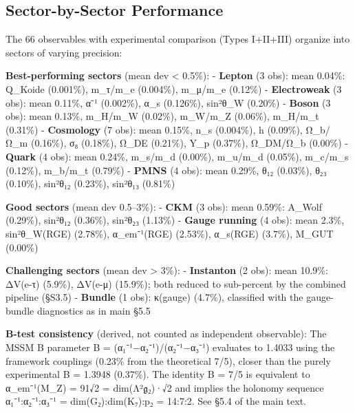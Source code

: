 \documentclass[11pt,a4paper]{article}
\begin{document}
\subsection{Sector-by-Sector Performance}\label{sector-by-sector-performance}

The 66 observables with experimental comparison (Types I+II+III) organize into sectors of varying precision:

\textbf{Best-performing sectors} (mean dev \textless{} 0.5\%): - \textbf{Lepton} (3 obs): mean 0.04\%: Q\_\allowbreak{}Koide (0.001\%), m\_\allowbreak{}τ/m\_\allowbreak{}e (0.004\%), m\_\allowbreak{}μ/m\_\allowbreak{}e (0.12\%) - \textbf{Electroweak} (3 obs): mean 0.11\%, α⁻¹ (0.002\%), α\_\allowbreak{}s (0.126\%), sin²θ\_\allowbreak{}W (0.20\%) - \textbf{Boson} (3 obs): mean 0.13\%, m\_\allowbreak{}H/m\_\allowbreak{}W (0.02\%), m\_\allowbreak{}W/m\_\allowbreak{}Z (0.06\%), m\_\allowbreak{}H/m\_\allowbreak{}t (0.31\%) - \textbf{Cosmology} (7 obs): mean 0.15\%, n\_\allowbreak{}s (0.004\%), h (0.09\%), Ω\_\allowbreak{}b/Ω\_\allowbreak{}m (0.16\%), σ₈ (0.18\%), Ω\_\allowbreak{}DE (0.21\%), Y\_\allowbreak{}p (0.37\%), Ω\_\allowbreak{}DM/Ω\_\allowbreak{}b (0.00\%) - \textbf{Quark} (4 obs): mean 0.24\%, m\_\allowbreak{}s/m\_\allowbreak{}d (0.00\%), m\_\allowbreak{}u/m\_\allowbreak{}d (0.05\%), m\_\allowbreak{}c/m\_\allowbreak{}s (0.12\%), m\_\allowbreak{}b/m\_\allowbreak{}t (0.79\%) - \textbf{PMNS} (4 obs): mean 0.29\%, θ₁₂ (0.03\%), θ₂₃ (0.10\%), sin²θ₁₂ (0.23\%), sin²θ₁₃ (0.81\%)

\textbf{Good sectors} (mean dev 0.5--3\%): - \textbf{CKM} (3 obs): mean 0.59\%: A\_\allowbreak{}Wolf (0.29\%), sin²θ₁₂ (0.36\%), sin²θ₂₃ (1.13\%) - \textbf{Gauge running} (4 obs): mean 2.3\%, sin²θ\_\allowbreak{}W(RGE) (2.78\%), α\_\allowbreak{}em⁻¹(RGE) (2.53\%), α\_\allowbreak{}s(RGE) (3.7\%), M\_\allowbreak{}GUT (0.00\%)

\textbf{Challenging sectors} (mean dev \textgreater{} 3\%): - \textbf{Instanton} (2 obs): mean 10.9\%: ΔV(e-τ) (5.9\%), ΔV(e-μ) (15.9\%); both reduced to sub-percent by the combined pipeline (§S3.5) - \textbf{Bundle} (1 obs): κ(gauge) (4.7\%), classified with the gauge-bundle diagnostics as in main §5.5

\textbf{B-test consistency} (derived, not counted as independent observable): The MSSM B parameter B = (α₁⁻¹−α₂⁻¹)/(α₂⁻¹−α₃⁻¹) evaluates to 1.4033 using the framework couplings (0.23\% from the theoretical 7/5), closer than the purely experimental B = 1.3948 (0.37\%). The identity B = 7/5 is equivalent to α\_\allowbreak{}em⁻¹(M\_\allowbreak{}Z) = 91√2 = dim(Λ²\ensuremath{\mathfrak{g}}₂)·√2 and implies the holonomy sequence α₁⁻¹:α₂⁻¹:α₃⁻¹ = dim(G₂):dim(K₇):p₂ = 14:7:2. See §5.4 of the main text.
\end{document}
